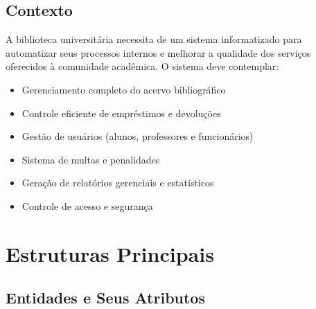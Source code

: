 \documentclass[12pt,a4paper]{article}
\begin{document}
\subsection{Contexto}
A biblioteca universitária necessita de um sistema informatizado para automatizar seus processos internos e melhorar a qualidade dos serviços oferecidos à comunidade acadêmica. O sistema deve contemplar:

\begin{itemize}
    \item Gerenciamento completo do acervo bibliográfico
    \item Controle eficiente de empréstimos e devoluções
    \item Gestão de usuários (alunos, professores e funcionários)
    \item Sistema de multas e penalidades
    \item Geração de relatórios gerenciais e estatísticos
    \item Controle de acesso e segurança
\end{itemize}



\section{Estruturas Principais}

\subsection{Entidades e Seus Atributos}
\end{document}
